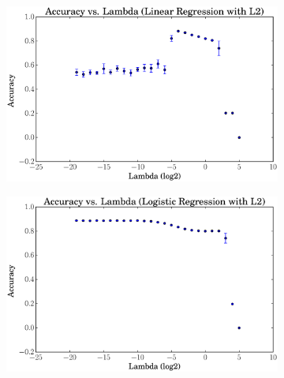 \documentclass[a4paper, 12pt]{article}
\begin{document}
\begin{figure}[htpb]
    \centering
    \begin{subfigure}[htpb]{0.45\textwidth}
        \includegraphics[width=\textwidth]{acc_vs_lambda_linregL2}
        \caption{}
        \label{fig:snt}
    \end{subfigure}
    \begin{subfigure}[htpb]{0.45\textwidth}
        \includegraphics[width=\textwidth]{acc_vs_lambda_logregL2}
        \caption{}
        \label{fig:ret}
    \end{subfigure}
    \caption{}\label{fig:viz}
\end{figure}
\end{document}
